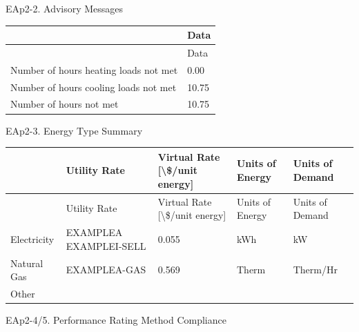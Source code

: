 EAp2-2. Advisory Messages

\begin{longtable}[c]{@{}ll@{}}
\toprule
 & Data \tabularnewline
\midrule
\endfirsthead

\toprule
 & Data \tabularnewline
\midrule
\endhead

Number of hours heating loads not met & 0.00 \tabularnewline
Number of hours cooling loads not met & 10.75 \tabularnewline
Number of hours not met & 10.75 \tabularnewline
\bottomrule
\end{longtable}

EAp2-3. Energy Type Summary

\begin{longtable}[c]{>{\raggedright}p{1.2in}>{\raggedright}p{1.2in}>{\raggedright}p{1.2in}>{\raggedright}p{1.2in}>{\raggedright}p{1.2in}}
\toprule
 & Utility Rate & Virtual Rate [\textbackslash\$/unit energy] & Units of Energy & Units of Demand \tabularnewline
\midrule
\endfirsthead

\toprule
 & Utility Rate & Virtual Rate [\textbackslash\$/unit energy] & Units of Energy & Units of Demand \tabularnewline
\midrule
\endhead

Electricity & EXAMPLEA EXAMPLEI-SELL & 0.055 & kWh & kW \tabularnewline
Natural Gas & EXAMPLEA-GAS & 0.569 & Therm & Therm/Hr \tabularnewline
Other & ~ & ~ & ~ & ~ \tabularnewline
\bottomrule
\end{longtable}

EAp2-4/5. Performance Rating Method Compliance

